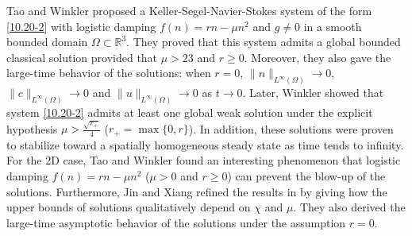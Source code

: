 \documentclass[10pt,a4paper]{amsart}
\numberwithin{equation}{section}
\begin{document}
Tao and Winkler \cite{s1468-31} proposed a Keller-Segel-Navier-Stokes system of the 
form \eqref{10.20-2} with logistic damping $ f(n) = rn -\mu n^2 $ and 
$ g \neq 0 $ in a smooth bounded domain $\Omega \subset \mathbb{R}^3$. 
They proved that this system admits a global bounded classical solution provided that 
$\mu>23$ and $r\geq0$. Moreover, they also gave the large-time behavior of the 
solutions: when $r=0$, $\|n\|_{L^\infty(\Omega)}\rightarrow 0$, 
$\|c\|_{L^\infty(\Omega)}\rightarrow 0$ and $\|u\|_{L^\infty(\Omega)}\rightarrow 0$ 
as $t\rightarrow 0$. Later, Winkler \cite{Winkler2019}
showed that system \eqref{10.20-2} admits at least one global weak solution under the 
explicit hypothesis $\mu>\frac{\sqrt{r_+}}{4}$ ($r_+=\max\{0,r\}$). 
In addition, these solutions were proven to stabilize toward a spatially homogeneous 
steady state as time tends to infinity. For the 2D case, Tao and Winkler
\cite{s1468-30} found an interesting phenomenon that logistic damping 
$ f(n) = rn -\mu n^2 $ ($\mu>0$ and $r\geq0$) can prevent the blow-up of the solutions. 
Furthermore, Jin and Xiang \cite{Jin} refined the results in \cite{s1468-30} by giving 
how the upper bounds of solutions  qualitatively depend on $\chi$ and $\mu$. 
They also derived the large-time asymptotic behavior of the solutions under the 
assumption $r = 0$.
\end{document}

